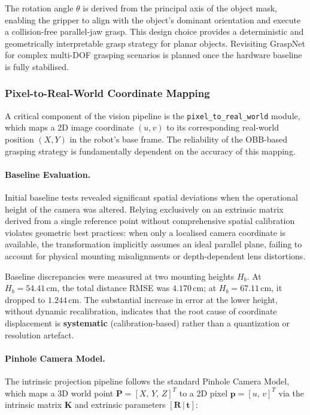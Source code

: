 \documentclass[12pt]{extarticle}
\begin{document}
The rotation angle $\theta$ is derived from the principal axis of the object mask, enabling the gripper to align with the object's dominant orientation and execute a collision-free parallel-jaw grasp. This design choice provides a deterministic and geometrically interpretable grasp strategy for planar objects. Revisiting GraspNet for complex multi-DOF grasping scenarios is planned once the hardware baseline is fully stabilised.

\subsubsection{Pixel-to-Real-World Coordinate Mapping}

A critical component of the vision pipeline is the \texttt{pixel\_to\_real\_world} module, which maps a 2D image coordinate $(u, v)$ to its corresponding real-world position $(X, Y)$ in the robot's base frame. The reliability of the OBB-based grasping strategy is fundamentally dependent on the accuracy of this mapping.

\paragraph{Baseline Evaluation.}

Initial baseline tests revealed significant spatial deviations when the operational height of the camera was altered. Relying exclusively on an extrinsic matrix derived from a single reference point without comprehensive spatial calibration violates geometric best practices: when only a localised camera coordinate is available, the transformation implicitly assumes an ideal parallel plane, failing to account for physical mounting misalignments or depth-dependent lens distortions.

Baseline discrepancies were measured at two mounting heights $H_b$. At $H_b = 54.41\,\text{cm}$, the total distance RMSE was $4.170\,\text{cm}$; at $H_b = 67.11\,\text{cm}$, it dropped to $1.244\,\text{cm}$. The substantial increase in error at the lower height, without dynamic recalibration, indicates that the root cause of coordinate displacement is \textbf{systematic} (calibration-based) rather than a quantization or resolution artefact.

\paragraph{Pinhole Camera Model.}

The intrinsic projection pipeline follows the standard Pinhole Camera Model, which maps a 3D world point $\mathbf{P} = [X,\,Y,\,Z]^T$ to a 2D pixel $\mathbf{p} = [u,\,v]^T$ via the intrinsic matrix $\mathbf{K}$ and extrinsic parameters $[\mathbf{R}\,|\,\mathbf{t}]$:
\end{document}
